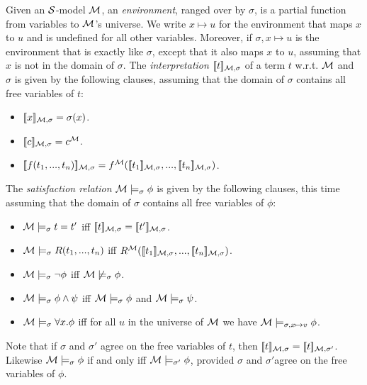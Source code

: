 Given an $\mathcal{S}$-model $\mathcal{M}$, an \emph{environment}, ranged over by
$\sigma$, is a partial function from variables to $\mathcal{M}$'s
universe.  We write $x \mapsto u$ for the environment that maps $x$ to
$u$ and is undefined for all other variables. Moreover, if $\sigma, x
\mapsto u$ is the environment that is exactly like $\sigma$, except
that it also maps $x$ to $u$, assuming that $x$ is not in the domain
of $\sigma$.  The \emph{interpretation} $\lbrack\!\lbrack t \rbrack\!\rbrack_{\mathcal{M}, \sigma}$
of a term $t$ w.r.t. $\mathcal{M}$ and $\sigma$ is given by the following
clauses, assuming that the domain of $\sigma$ contains all free
variables of $t$:
\begin{itemize}

\item $\lbrack\!\lbrack x \rbrack\!\rbrack_{\mathcal{M}, \sigma} = \sigma(x)$.
\item $\lbrack\!\lbrack c \rbrack\!\rbrack_{\mathcal{M}, \sigma} = c^{\mathcal{M}}$.
\item $\lbrack\!\lbrack f(t_1, ..., t_n) \rbrack\!\rbrack_{\mathcal{M}, \sigma} =
  f^{\mathcal{M}}(\lbrack\!\lbrack t_1 \rbrack\!\rbrack_{\mathcal{M}, \sigma}, ..., \lbrack\!\lbrack t_n \rbrack\!\rbrack_{\mathcal{M},
    \sigma})$.

\end{itemize}

\NI The \emph{satisfaction relation} $\mathcal{M} \models_{\sigma} \phi$
is given by the following clauses, this time assuming that the domain
of $\sigma$ contains all free variables of $\phi$:
\begin{itemize}

\item $\mathcal{M} \models_{\sigma} t = t'$ iff $\lbrack\!\lbrack t \rbrack\!\rbrack_{\mathcal{M}, \sigma} = \lbrack\!\lbrack t' \rbrack\!\rbrack_{\mathcal{M}, \sigma}$.
\item $\mathcal{M} \models_{\sigma} R(t_1, ..., t_n)$ iff
  $R^{\mathcal{M}}(\lbrack\!\lbrack t_1 \rbrack\!\rbrack_{\mathcal{M}, \sigma}, ..., \lbrack\!\lbrack t_n \rbrack\!\rbrack_{\mathcal{M},
  \sigma})$.
\item $\mathcal{M} \models_{\sigma} \neg \phi$ iff $\mathcal{M} \not\models_{\sigma} \phi$.
\item $\mathcal{M} \models_{\sigma} \phi \land \psi$ iff $\mathcal{M} \models_{\sigma} \phi$ and $\mathcal{M} \models_{\sigma} \psi$.
\item $\mathcal{M} \models_{\sigma} \forall x.\phi$ iff for all $u$ in the
  universe of $\mathcal{M}$ we have $\mathcal{M} \models_{\sigma, x \mapsto v} \phi$.

\end{itemize}

\NI Note that if $\sigma$ and $\sigma'$ agree on the free variables of
$t$, then $\lbrack\!\lbrack t \rbrack\!\rbrack_{\mathcal{M}, \sigma} =\lbrack\!\lbrack t \rbrack\!\rbrack_{\mathcal{M},
  \sigma'}$. Likewise $\mathcal{M} \models_{\sigma} \phi$ if and only iff
$\mathcal{M} \models_{\sigma'} \phi$, provided $\sigma$ and $\sigma'$agree
on the free variables of $\phi$.

